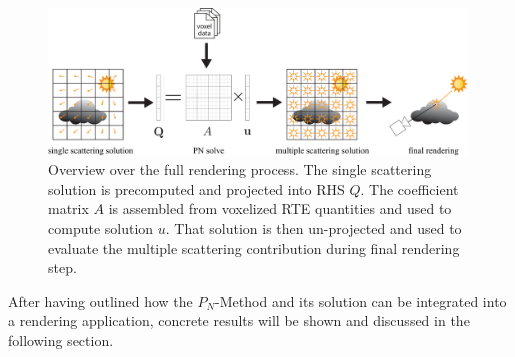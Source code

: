 \begin{figure}[h]
\centering
\includegraphics[width=0.99\textwidth]{04_pn_method/figures/fig_rendering_pipeline.pdf}
\caption{Overview over the full rendering process. The single scattering solution is precomputed and projected into RHS $Q$. The coefficient matrix $A$ is assembled from voxelized RTE quantities and used to compute solution $u$. That solution is then un-projected and used to evaluate the multiple scattering contribution during final rendering step.}
\label{fig:pn_rendering_integration_overview}
\end{figure}

After having outlined how the $P_N$-Method and its solution can be integrated into a rendering application, concrete results will be shown and discussed in the following section.
